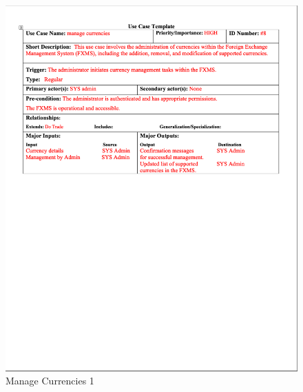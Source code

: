 \documentclass[a4paper]{report}
\begin{document}
\begin{figure}[h!]
    \centering
    \includegraphics[width=\textwidth]{images/uc/8.1-manage-currencies.png}
    \caption{Manage Currencies 1}
    \label{fig:8.1-manage-currencies}
\end{figure}
\end{document}
